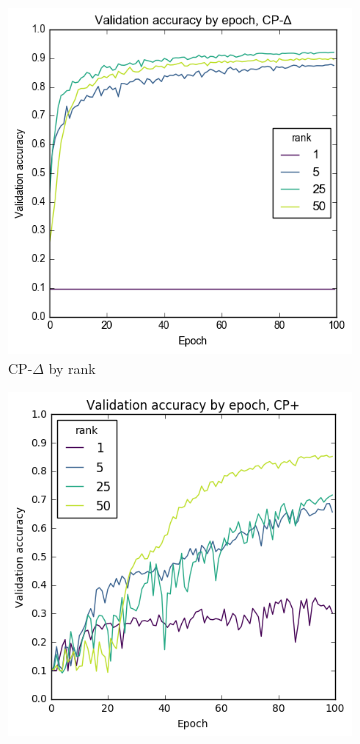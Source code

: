 \begin{figure}[ht]
\centering
\begin{subfigure}[t]{0.45\textwidth}
	\includegraphics[width=\textwidth]{exps/mnist/cp-del-rank}
	\caption{CP-\(\Delta\) by rank}
\end{subfigure}\hfill
\begin{subfigure}[t]{0.45\textwidth}
	\includegraphics[width=\textwidth]{exps/mnist/cp+rank}

\end{subfigure}
\end{figure}
